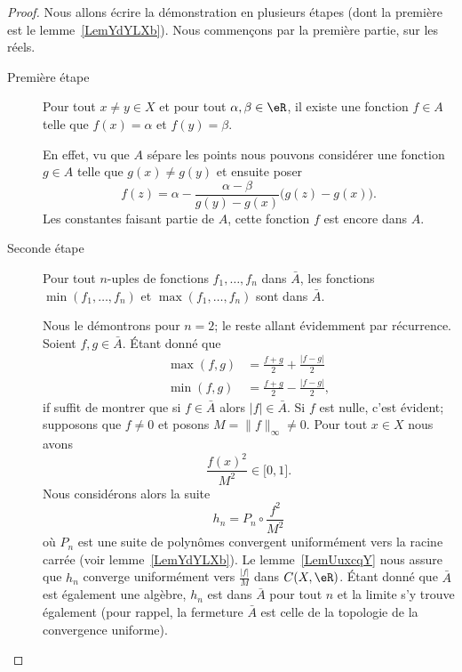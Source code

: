 \begin{proof}
	Nous allons écrire la démonstration en plusieurs étapes (dont la première est le lemme~\ref{LemYdYLXb}). Nous commençons par la première partie, sur les réels.

	\begin{description}
		\item[Première étape] Pour tout \( x\neq y\in X\) et pour tout \( \alpha,\beta\in \eR\), il existe une fonction \( f\in A\) telle que \( f(x)=\alpha\) et \( f(y)=\beta\).

		      En effet, vu que \( A\) sépare les points nous pouvons considérer une fonction \( g\in A\) telle que \( g(x)\neq g(y)\) et ensuite poser
		      \begin{equation}
			      f(z)=\alpha-\frac{ \alpha-\beta }{ g(y)-g(x) }\big( g(z)-g(x) \big).
		      \end{equation}
		      Les constantes faisant partie de \( A\), cette fonction \( f\) est encore dans \( A\).

		\item[Seconde étape] Pour tout \( n\)-uples de fonctions \( f_1,\ldots, f_n\) dans \( \bar A\), les fonctions \( \min(f_1,\ldots, f_n)\) et \( \max(f_1,\ldots, f_n)\) sont dans \( \bar A\).

		      Nous le démontrons pour \( n=2\); le reste allant évidemment par récurrence. Soient \( f,g\in \bar A\). Étant donné que
		      \begin{subequations}
			      \begin{align}
				      \max(f,g) & =\frac{ f+g }{2}+\frac{ | f-g | }{2}  \\
				      \min(f,g) & =\frac{ f+g }{2}-\frac{ | f-g | }{2},
			      \end{align}
		      \end{subequations}
		      if suffit de montrer que si \( f\in\bar A\) alors \( | f |\in \bar A\). Si \( f\) est nulle, c'est évident; supposons que \( f\neq 0\) et posons \( M=\| f \|_{\infty}\neq 0\). Pour tout \( x\in X\) nous avons
		      \begin{equation}
			      \frac{ f(x)^2 }{ M^2 }\in \mathopen[ 0 , 1 \mathclose].
		      \end{equation}
		      Nous considérons alors la suite
		      \begin{equation}
			      h_n=P_n\circ\frac{ f^2 }{ M^2 }
		      \end{equation}
		      où \( P_n\) est une suite de polynômes convergent uniformément vers la racine carrée (voir lemme~\ref{LemYdYLXb}). Le lemme~\ref{LemUuxcqY} nous assure que \( h_n\) converge uniformément vers \( \frac{ | f | }{ M }\) dans \( C(X,\eR)\). Étant donné que \( \bar A\) est également une algèbre, \( h_n\) est dans \( \bar A\) pour tout \( n\) et la limite s'y trouve également (pour rappel, la fermeture \( \bar A\) est celle de la topologie de la convergence uniforme).


\end{description}
\end{proof}
